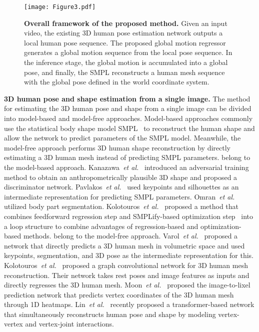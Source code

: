 \documentclass[10pt,twocolumn,letterpaper]{article}
\begin{document}
\begin{figure*}[t]
\texttt{[image: Figure3.pdf]}
\vspace*{-6mm}
\caption{\textbf{Overall framework of the proposed method.} Given an input video, the existing 3D human pose estimation network outputs a local human pose sequence. The proposed global motion regressor generates a global motion sequence from the local pose sequence. In the inference stage, the global motion is accumulated into a global pose, and finally, the SMPL reconstructs a human mesh sequence with the global pose defined in the world coordinate system.}
\label{fig3}
\vspace*{-1mm}
\end{figure*}


\textbf{3D human pose and shape estimation from a single image.} The method for estimating the 3D human pose and shape from a single image can be divided into model-based and model-free approaches. Model-based approaches commonly use the statistical body shape model SMPL~\cite{loper2015smpl} to reconstruct the human shape and allow the network to predict parameters of the SMPL model. Meanwhile, the model-free approach performs 3D human shape reconstruction by directly estimating a 3D human mesh instead of predicting SMPL parameters. \cite{kanazawa2018end,pavlakos2018learning,omran2018neural,kolotouros2019learning} belong to the model-based approach. Kanazawa~\textit{et al.}~\cite{kanazawa2018end} introduced an adversarial training method to obtain an anthropometrically plausible 3D shape and proposed a discriminator network. Pavlakos~\textit{et al.}~\cite{pavlakos2018learning} used keypoints and silhouettes as an intermediate representation for predicting SMPL parameters. Omran~\textit{et al.}~\cite{omran2018neural} utilized body part segmentation. Kolotouros~\textit{et al.}~\cite{kolotouros2019learning} proposed a method that combines feedforward regression step and SMPLify-based optimization step~\cite{bogo2016keep} into a loop structure to combine advantages of regression-based and optimization-based methods. \cite{varol2018bodynet,kolotouros2019convolutional,Moon_2020_ECCV_I2L-MeshNet,lin2021end} belong to the model-free approach. Varol~\textit{et al.}~\cite{varol2018bodynet} proposed a network that directly predicts a 3D human mesh in volumetric space and used keypoints, segmentation, and 3D pose as the intermediate representation for this. Kolotouros~\textit{et al.}~\cite{kolotouros2019convolutional} proposed a graph convolutional network for 3D human mesh reconstruction. Their network takes rest poses and image features as inputs and directly regresses the 3D human mesh. Moon~\textit{et al.}~\cite{Moon_2020_ECCV_I2L-MeshNet} proposed the image-to-lixel prediction network that predicts vertex coordinates of the 3D human mesh through 1D heatmaps. Lin~\textit{et al.}~\cite{lin2021end} recently proposed a transformer-based network that simultaneously reconstructs human pose and shape by modeling vertex-vertex and vertex-joint interactions.
\end{document}
